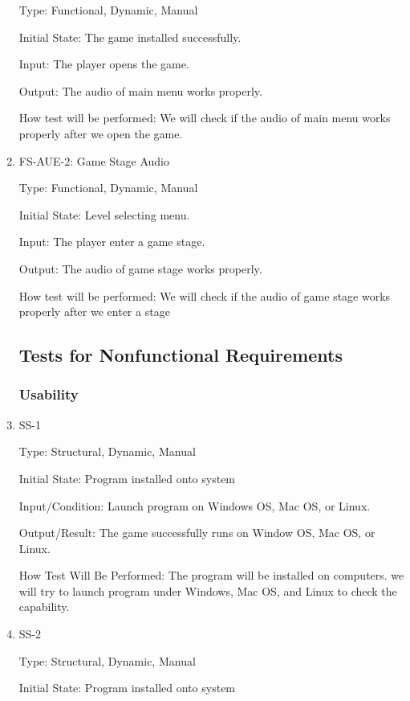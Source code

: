 \documentclass[12pt]{article}
\begin{document}
\begin{enumerate}
	Type: Functional, Dynamic, Manual
					
    Initial State: The game installed successfully.
					
	Input: The player opens the game. 
					
	Output: The audio of main menu works properly.
					
	How test will be performed: We will check if the audio of main menu works properly after we open the game.
	
	\item{FS-AUE-2: Game Stage Audio}
					
	Type: Functional, Dynamic, Manual
					
    Initial State: Level selecting menu.
					
	Input: The player enter a game stage.
					
	Output: The audio of game stage works properly.
					
	How test will be performed: We will check if the audio of game stage works properly after we enter a stage
					
					

    \subsection{Tests for Nonfunctional Requirements}

    \subsubsection{Usability}


    \item SS-1

    Type: Structural, Dynamic, Manual

    Initial State: Program installed onto system 

    Input/Condition: Launch program on Windows OS, Mac OS, or Linux.

    Output/Result: The game successfully runs on Window OS, Mac OS, or Linux.

    How Test Will Be Performed: The program will be installed on computers. we will try to launch program under Windows, Mac OS, and Linux to check the capability.


    \item SS-2

    Type: Structural, Dynamic, Manual

    Initial State: Program installed onto system


\end{enumerate}
\end{document}
